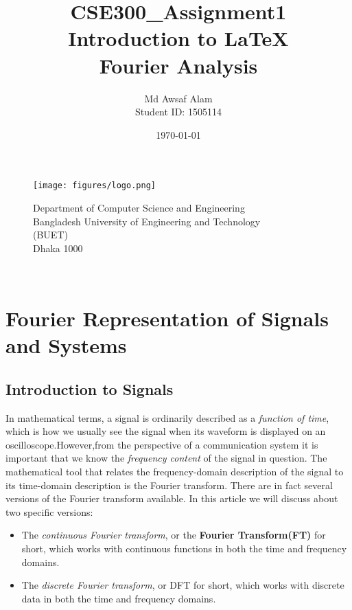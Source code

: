 \documentclass{article}
\title{CSE300\_Assignment1\\Introduction to \LaTeX \\Fourier Analysis}
\author{Md Awsaf Alam\\Student ID: 1505114}
\date{}
\newcommand{\FT}{Fourier Transform}
\begin{document}
\maketitle

\begin{figure}[b!]
    \centering
    \texttt{[image: figures/logo.png]}
    \centering

\bigskip
    \large Department of Computer Science and Engineering \\
    \bigskip
\large Bangladesh University of Engineering and Technology\\
\bigskip
\large (BUET)\\
\bigskip
\large Dhaka 1000\\
\bigskip
\date{\today}\\
\bigskip
\end{figure}


\newpage

\tableofcontents
\newpage

\section{Fourier Representation of Signals and Systems}

\subsection{Introduction to Signals}
In mathematical terms, a signal is ordinarily described as a \textit{function of time}, which is how
we usually see the signal when its waveform is displayed on an oscilloscope.However,from the perspective of a communication system it is important
that we know the \textit{frequency content} of the signal in question. The mathematical tool that
relates the frequency-domain description of the signal to its time-domain description is the
Fourier transform. There are in fact several versions of the Fourier transform available. In this article we will discuss about two specific versions:
\begin{itemize}
    \item The \textit{continuous Fourier transform}, or the \textbf{\FT (FT)} for short, which
works with continuous functions in both the time and frequency domains.
    \item The \textit{discrete Fourier transform}, or DFT for short, which works with discrete data in
both the time and frequency domains.
\end{itemize}
\end{document}
